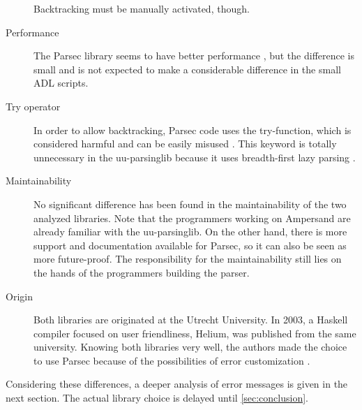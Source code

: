 \begin{description}
		Backtracking must be manually activated, though.
	\item[Performance] The Parsec library seems to have better performance \cite{benchmark}, but the difference is small and is not expected to make a considerable difference in the small ADL scripts.
	\item[Try operator] In order to allow backtracking, Parsec code uses the try-function, which is considered harmful and can be easily misused \cite{try-harmful}.
		This keyword is totally unnecessary in the uu-parsinglib because it uses breadth-first lazy parsing \cite{uu-doc}.
	\item[Maintainability] No significant difference has been found in the maintainability of the two analyzed libraries.
		Note that the programmers working on Ampersand are already familiar with the uu-parsinglib.
		On the other hand, there is more support and documentation available for Parsec, so it can also be seen as more future-proof.
		The responsibility for the maintainability still lies on the hands of the programmers building the parser.
	\item[Origin] Both libraries are originated at the Utrecht University.
		In 2003, a Haskell compiler focused on user friendliness, Helium, was published from the same university.
		Knowing both libraries very well, the authors made the choice to use Parsec because of the possibilities of error customization \cite{helium-parser}.
\end{description}
%
Considering these differences, a deeper analysis of error messages is given in the next section.
The actual library choice is delayed until \autoref{sec:conclusion}.

